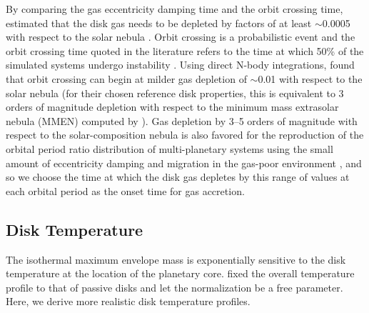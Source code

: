 \documentclass[twocolumn]{aastex631}
\begin{document}
By comparing the gas eccentricity damping time and the orbit crossing time, \citet{Lee16} estimated that the disk gas needs to be depleted by factors of at least $\sim$0.0005 with respect to the solar nebula \citep[see also][]{Kominami02}. Orbit crossing is a probabilistic event and the orbit crossing time quoted in the literature refers to the time at which 50\% of the simulated systems undergo instability \citep[see e.g.,][]{Pu15}. Using direct N-body integrations, \citet{Dawson16} found that orbit crossing can begin at milder gas depletion of $\sim$0.01 with respect to the solar nebula (for their chosen reference disk properties, this is equivalent to 3 orders of magnitude depletion with respect to the minimum mass extrasolar nebula (MMEN) computed by \citet{Chiang13}). Gas depletion by 3--5 orders of magnitude with respect to the solar-composition nebula is also favored for the reproduction of the orbital period ratio distribution of multi-planetary systems using the small amount of eccentricity damping and migration in the gas-poor environment \citep{Choksi20}, and so we choose the time at which the disk gas depletes by this range of values at each orbital period as the onset time for gas accretion. 

\subsection{Disk Temperature}
\label{sse:diskT}

The isothermal maximum envelope mass is exponentially sensitive to the disk temperature at the location of the planetary core. \citet{Lee21} fixed the overall temperature profile to that of passive disks and let the normalization be a free parameter. Here, we derive more realistic disk temperature profiles.
\end{document}
